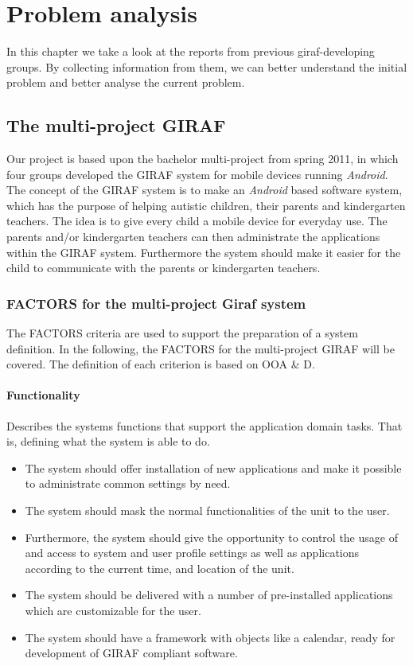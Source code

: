 \chapter{Problem analysis}

In this chapter we take a look at the reports from previous giraf-developing groups. By collecting information from them, we can better understand the initial problem and better analyse the current problem.

\section{The multi-project GIRAF}
Our project is based upon the bachelor multi-project from spring 2011, in which four groups developed the GIRAF system for mobile devices running \textit{Android}. The concept of the GIRAF system is to make an \textit{Android} based software system, which has the purpose of helping autistic children, their parents and kindergarten teachers. The idea is to give every child a mobile device for everyday use. The parents and/or kindergarten teachers can then administrate the applications within the GIRAF system. Furthermore the system should make it easier for the child to communicate with the parents or kindergarten teachers. 

\subsection{FACTORS for the multi-project Giraf system}
The FACTORS criteria are used to support the preparation of a system definition. In the following, the FACTORS for the multi-project GIRAF will be covered\cite{giraffactors}. The definition of each criterion is based on OOA \& D\cite{OOAD}.

\subsubsection{Functionality} 
Describes the systems functions that support the application domain tasks. That is, defining
what the system is able to do.
\begin{itemize}
	\item The system should offer installation of new applications and make it possible to administrate common settings by need. 
	\item The system should mask the normal functionalities of the unit to the user.
	\item Furthermore, the system should give the opportunity to control the usage of and access to system and user profile settings as well as applications according to the current time, and location of the unit.
	\item The system should be delivered with a number of pre-installed applications which are customizable for the user.
	\item The system should have a framework with objects like a calendar, ready for development of GIRAF compliant software.
\end{itemize}

